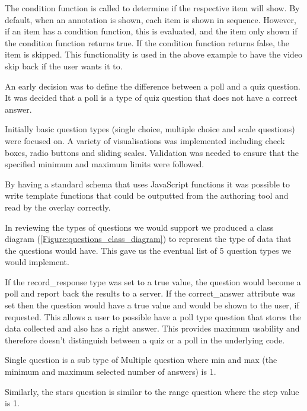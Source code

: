 The condition function is called to determine if the respective item will show.
By default, when an annotation is shown, each item is shown in sequence.
However, if an item has a condition function, this is evaluated, and the item
only shown if the condition function returns true. If the condition function
returns false, the item is skipped. This functionality is used in the above
example to have the video skip back if the user wants it to.


An early decision was to define the difference between a poll and a quiz
question. It was decided that a poll is a type of quiz question that does not
have a correct answer.

Initially basic question types (single choice, multiple choice and scale
questions) were focused on. A variety of visualisations was implemented
including check boxes, radio buttons and sliding scales. Validation was needed
to ensure that the specified minimum and maximum limits were followed.

By having a standard schema that uses JavaScript functions it was possible to
write template functions that could be outputted from the authoring tool and
read by the overlay correctly.

In reviewing the types of questions we would support we produced a class diagram (\autoref{Figure:questions_class_diagram}) to represent the type of data that the questions would have. This gave us the eventual list of 5 question types we would implement.

If the record\_response type was set to a true value, the question would become a poll and report back the results to a server. If the correct\_answer attribute was set then the question would have a true value and would be shown to the user, if requested. This allows a user to possible have a poll type question that stores the data collected and also has a right answer. This provides maximum usability and therefore doesn't distinguish between a quiz or a poll in the underlying code.

Single question is a sub type of Multiple question where min and max (the minimum and maximum selected number of answers) is 1.

Similarly, the stars question is similar to the range question where the step value is 1.

